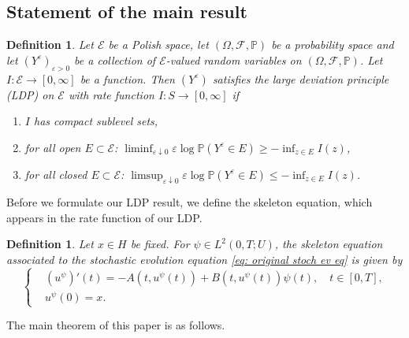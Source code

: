 \documentclass{amsart}
\newcommand{\<}{\langle}
\newcommand{\?}{\rangle}
\theoremstyle{plain}
\theoremstyle{remark}
\theoremstyle{plain}
\newtheorem{definition}[theorem]{Definition}
\numberwithin{equation}{section}
\newcommand{\F}{\mathcal{F}}
\renewcommand{\P}{\mathbb{P}}
\newcommand{\Om}{\Omega}
\newcommand{\eps}{\varepsilon}
\begin{document}
\subsection{Statement of the main result}

\begin{definition}\label{def: LDP}
Let $\mathcal{E}$ be a Polish space, let $(\Om,\F,\P)$ be a probability space and let $(Y^\eps)_{\eps>0}$ be a collection of $\mathcal{E}$-valued random variables on $(\Om,\F,\P)$. Let $I\colon \mathcal{E}\to[0,\infty]$ be a function. Then $(Y^{\eps})$ \emph{satisfies the large deviation principle (LDP) on $\mathcal{E}$} with rate function $I\colon S\to[0,\infty]$ if
\begin{enumerate}[label=\emph{(\roman*)},ref=\textup{(\roman*)}]
    \item $I$ has compact sublevel sets,
    \item for all open $E\subset \mathcal{E}$: $\liminf_{\eps\downarrow0}\eps\log \P(Y^{\eps}\in E)\geq -\inf_{z\in E}I(z)$,
    \item for all closed $E\subset \mathcal{E}$: $\limsup_{\eps\downarrow0}\eps\log \P(Y^{\eps}\in E)\leq -\inf_{z\in E}I(z)$.
\end{enumerate}
\end{definition}

Before we formulate our LDP result, we define  the skeleton equation, which appears in the rate function of our LDP.

\begin{definition}\label{def: skeleton}
Let $x\in H$ be fixed.
For $\psi\in L^2(0,T;U)$, the \emph{skeleton equation} associated to the stochastic evolution equation \eqref{eq: original stoch ev eq} is given by
\begin{equation}\label{eq: skeleton eq}
  \begin{cases}
  &(u^\psi)'(t)=-A(t,u^\psi(t))+B(t,u^\psi(t))\psi(t), \quad t\in[0,T],\\
  &u^\psi(0)=x.
\end{cases}
\end{equation}
\end{definition}

The main theorem of this paper is as follows.
\end{document}
